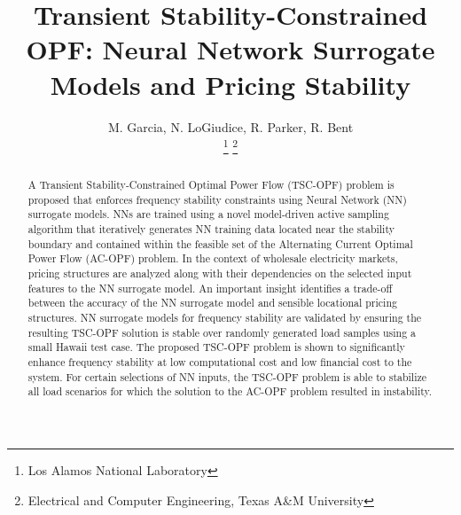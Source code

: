 \documentclass[lettersize,journal]{IEEEtran}
\begin{document}
\title{Transient Stability-Constrained OPF: Neural Network Surrogate Models and Pricing Stability}

\author{M. Garcia, N. LoGiudice, R. Parker, R. Bent

\thanks{ Los Alamos National Laboratory}
\thanks{ Electrical and Computer Engineering, Texas A\&M University}
}






\maketitle

\begin{abstract}
A Transient Stability-Constrained Optimal Power Flow (TSC-OPF) problem is proposed that enforces frequency stability constraints using Neural Network (NN) surrogate models.  NNs are trained using a novel model-driven active sampling algorithm that iteratively generates NN training data located near the stability boundary and contained within the feasible set of the Alternating Current Optimal Power Flow (AC-OPF) problem.  In the context of wholesale electricity markets, pricing structures are analyzed along with their dependencies on the selected input features to the NN surrogate model.  An important insight identifies a trade-off between the accuracy of the NN surrogate model and sensible locational pricing structures.  NN surrogate models for frequency stability are validated by ensuring the resulting TSC-OPF solution is stable over randomly generated load samples using a small Hawaii test case.  The proposed TSC-OPF problem is shown to significantly enhance frequency stability at low computational cost and low financial cost to the system.  For certain selections of NN inputs, the TSC-OPF problem is able to stabilize all load scenarios for which the solution to the AC-OPF problem resulted in instability.  
\end{abstract}
\end{document}
